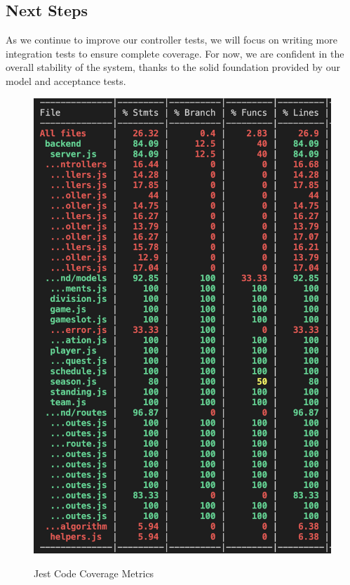 \documentclass[12pt, titlepage]{article}
\begin{document}
\subsection{Next Steps}
As we continue to improve our controller tests, we will focus on writing more integration tests to ensure complete coverage. For now, we are confident in the overall stability of the system, thanks to the solid foundation provided by our model and acceptance tests.

\begin{figure}[htbp]
    \caption{Jest Code Coverage Metrics}
    \centering
    \includegraphics[width=\textwidth]{coverage.png}
    \label{fig:coverage}
\end{figure}



\end{document}
